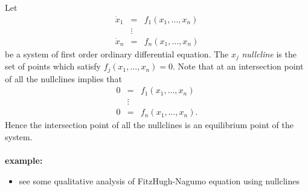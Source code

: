\documentclass[12pt]{article}
\begin{document}
Let
\begin{eqnarray*}
\dot{x}_1 &=& f_1(x_1,\ldots,x_n)\\
& \vdots & \\
\dot{x}_n &=& f_n(x_1,\ldots,x_n)
\end{eqnarray*}
be a system of first order ordinary differential equation.  The $x_j$ \emph{nullcline} is the set of points which satisfy $f_j(x_1,\ldots,x_n)=0$.  Note that at an intersection point of all the nullclines implies that 
\begin{eqnarray*}
0 &=& f_1(x_1,\ldots,x_n)\\
& \vdots & \\
0 &=& f_n(x_1,\ldots,x_n).
\end{eqnarray*}
Hence the intersection point of all the nullclines is an equilibrium point of the system.
\\\\
\textbf{example:}
\begin{itemize}
\item see some qualitative analysis of FitzHugh-Nagumo equation using nullclines
\end{itemize}
\end{document}
